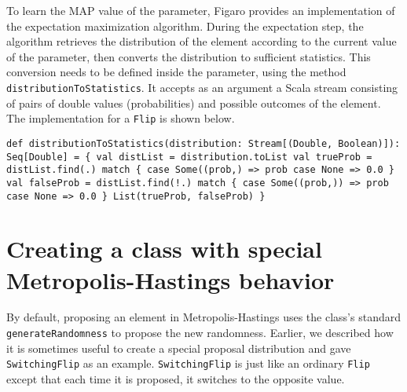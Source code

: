 To learn the MAP value of the parameter, Figaro provides an implementation of the expectation maximization algorithm. During the expectation step, the algorithm retrieves the distribution of the element according to the current value of the parameter, then converts the distribution to sufficient statistics. This conversion needs to be defined inside the parameter, using the method \texttt{distributionToStatistics}. It accepts as an argument a Scala stream consisting of pairs of double values (probabilities) and possible outcomes of the element. The implementation for a \texttt{Flip} is shown below.

\begin{flushleft}
\texttt{def distributionToStatistics(distribution: Stream[(Double, Boolean)]): Seq[Double] = \{
\newline \tab val distList = distribution.toList
\newline \tab val trueProb = 
\newline \tab \tab distList.find(\textunderscore.) match \{
\newline \tab \tab \tab case Some((prob,\textunderscore) => prob
\newline \tab \tab \tab case None => 0.0
\newline \tab \tab \}
\newline \tab val falseProb = 
\newline \tab \tab distList.find(!\textunderscore.) match \{
\newline \tab \tab \tab case Some((prob,\textunderscore)) => prob
\newline \tab \tab \tab case None => 0.0
\newline \tab \tab \} 
\newline \tab List(trueProb, falseProb)
\newline \}
}
\end{flushleft}

\section{Creating a class with special Metropolis-Hastings behavior}

By default, proposing an element in Metropolis-Hastings uses the class's standard \texttt{generateRandomness} to propose the new randomness. Earlier, we described how it is sometimes useful to create a special proposal distribution and gave \texttt{SwitchingFlip} as an example. \texttt{SwitchingFlip} is just like an ordinary \texttt{Flip} except that each time it is proposed, it switches to the opposite value.

